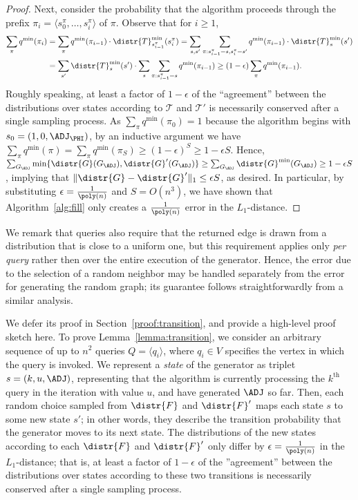 \begin{proof}
Next, consider the probability that the algorithm proceeds through the prefix $\pi_i = \langle s^\pi_0, \ldots, s^\pi_{i}\rangle$ of $\pi$. Observe that for $i \geq 1$,
\begin{align*}\sum_{\pi} q^{\min}(\pi_i) &=\sum_{\pi} q^{\min}(\pi_{i-1})\cdot \distr{T}^{\min}_{s^\pi_{i-1}}(s^\pi_{i}) 
= \sum_{s,s'} \sum_{\pi:s^\pi_{i-1} = s,s^\pi_{i} = s'} q^{\min}(\pi_{i-1})\cdot \distr{T}^{\min}_{s}(s') \\
&= \sum_{s'} \distr{T}^{\min}_s(s')\cdot\sum_{s} \sum_{\pi:s^\pi_{i-1} = s} q^{\min}(\pi_{i-1})
\geq (1-\epsilon) \sum_{\pi} q^{\min}(\pi_{i-1}).\end{align*}
Roughly speaking, at least a factor of $1-\epsilon$ of the ``agreement'' between the distributions over states according to $\mathcal{T}$ and $\mathcal{T}'$ is necessarily conserved after a single sampling process. As $\sum_{\pi} q^{\min}(\pi_0)=1$ because the algorithm begins with $s_0 = (1, 0, \ADJ_\PHI)$, by an inductive argument we have $\sum_{\pi} q^{\min}(\pi)=\sum_{\pi} q^{\min}(\pi_S) \geq (1-\epsilon)^S \geq 1-\epsilon S$. Hence, $\sum_{G_\ADJ} \min\{\distr{G}(G_\ADJ),\distr{G}'(G_\ADJ)\} \geq \sum_{G_\ADJ} \distr{G}^{\min}(G_\ADJ) \geq 1-\epsilon S$, implying that $\|\distr{G}-\distr{G}'\|_1 \leq \epsilon S$, as desired. In particular,  by substituting $\epsilon = \frac{1}{\poly(n)}$ and $S = O(n^3)$, we have shown that Algorithm~\ref{alg:fill} only creates a $\frac{1}{\poly(n)}$ error in the $L_1$-distance. 
\end{proof}

We remark that  queries also require that the returned edge is drawn from a distribution that is close to a uniform one, but this requirement applies only \emph{per query} rather then over the entire execution of the generator. Hence, the error due to the selection of a random neighbor may be handled separately from the error for generating the random graph; its guarantee follows straightforwardly from a similar analysis.


\iffalse
We defer its proof in Section~\ref{proof:transition}, and provide a high-level proof sketch here.
To prove Lemma~\ref{lemma:transition}, we consider an arbitrary sequence of up to $n^2$ queries  $Q = \langle q_i \rangle$, where $q_i \in V$ specifies the vertex in which the query  is invoked. We represent a \emph{state} of the generator as triplet $s = (k, u, \ADJ)$, representing that the algorithm is currently processing the $k^\textrm{th}$  query in the iteration with value $u$, and have generated $\ADJ$ so far. Then, each random choice sampled from $\distr{F}$ and $\distr{F}'$ maps each state $s$ to some new state $s'$; in other words, they describe the transition probability that the generator moves to its next state. The distributions of the new states according to each $\distr{F}$ and $\distr{F}'$ only differ by $\epsilon = \frac{1}{\poly(n)}$ in the $L_1$-distance; that is, at least a factor of $1-\epsilon$ of the ''agreement'' between the distributions over states according to these two transitions is necessarily conserved after a single sampling process. 

